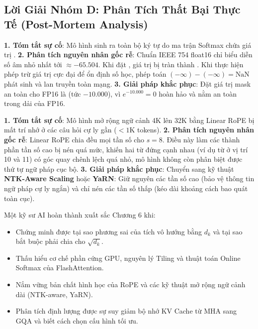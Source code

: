 \subsection{Lời Giải Nhóm D: Phân Tích Thất Bại Thực Tế (Post-Mortem Analysis)}

\begin{debugbox}
\textbf{1. Tóm tắt sự cố}: Mô hình sinh ra toàn bộ ký tự  do ma trận Softmax chứa giá trị .
\textbf{2. Phân tích nguyên nhân gốc rễ}:
Chuẩn IEEE 754 float16 chỉ biểu diễn số âm nhỏ nhất tới $\approx -65.504$. Khi đặt , giá trị bị tràn thành . Khi thực hiện phép trừ giá trị cực đại để ổn định số học, phép toán $(-\infty) - (-\infty) = \text{NaN}$ phát sinh và lan truyền toàn mạng.
\textbf{3. Giải pháp khắc phục}:
Đặt giá trị mask an toàn cho FP16 là  (tức $-10.000$), vì $e^{-10.000} = 0$ hoàn hảo và nằm an toàn trong dải của FP16.
\end{debugbox}

\begin{debugbox}
\textbf{1. Tóm tắt sự cố}: Mô hình mở rộng ngữ cảnh 4K lên 32K bằng Linear RoPE bị mất trí nhớ ở các câu hỏi cự ly gần ($< 1\text{K}$ tokens).
\textbf{2. Phân tích nguyên nhân gốc rễ}:
Linear RoPE chia đều mọi tần số cho $s = 8$. Điều này làm các thành phần tần số cao bị nén quá mức, khiến hai từ đứng cạnh nhau (ví dụ từ ở vị trí 10 và 11) có góc quay chênh lệch quá nhỏ, mô hình không còn phân biệt được thứ tự ngữ pháp cục bộ.
\textbf{3. Giải pháp khắc phục}:
Chuyển sang kỹ thuật \textbf{NTK-Aware Scaling} hoặc \textbf{YaRN}: Giữ nguyên các tần số cao (bảo vệ thông tin ngữ pháp cự ly ngắn) và chỉ nén các tần số thấp (kéo dài khoảng cách bao quát toàn cục).
\end{debugbox}

\begin{checkpointbox}
Một kỹ sư AI hoàn thành xuất sắc Chương 6 khi:
\begin{itemize}
  \item Chứng minh được tại sao phương sai của tích vô hướng bằng $d_k$ và tại sao bắt buộc phải chia cho $\sqrt{d_k}$.
  \item Thấu hiểu cơ chế phần cứng GPU, nguyên lý Tiling và thuật toán Online Softmax của FlashAttention.
  \item Nắm vững bản chất hình học của RoPE và các kỹ thuật mở rộng ngữ cảnh dài (NTK-aware, YaRN).
  \item Phân tích định lượng được sự suy giảm bộ nhớ KV Cache từ MHA sang GQA và biết cách chọn cấu hình tối ưu.
\end{itemize}
\end{checkpointbox}
